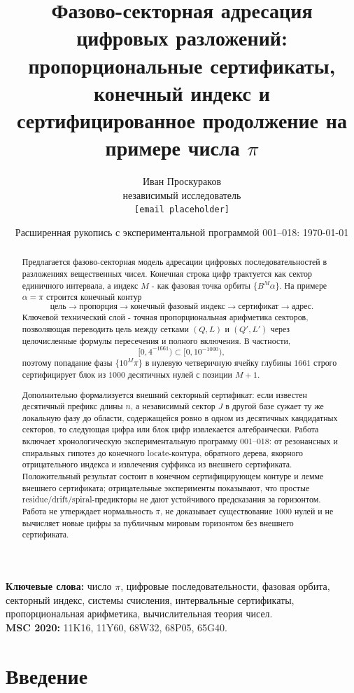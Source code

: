 \documentclass[11pt,a4paper]{article}
\title{Фазово-секторная адресация цифровых разложений:\\
пропорциональные сертификаты, конечный индекс и сертифицированное продолжение на примере числа $\pi$}
\author{Иван Проскураков\\\small независимый исследователь\\\small \texttt{[email placeholder]}}
\date{Расширенная рукопись с экспериментальной программой 001--018: \today}
\begin{document}
\maketitle

\begin{abstract}
Предлагается фазово-секторная модель адресации цифровых последовательностей в разложениях вещественных чисел.  Конечная строка цифр трактуется как сектор единичного интервала, а индекс $M$ - как фазовая точка орбиты $\{B^M\alpha\}$.  На примере $\alpha=\pi$ строится конечный контур
\[
  \text{цель}\to\text{пропорция}\to\text{конечный фазовый индекс}\to\text{сертификат}\to\text{адрес}.
\]
Ключевой технический слой - точная пропорциональная арифметика секторов, позволяющая переводить цель между сетками $(Q,L)$ и $(Q',L')$ через целочисленные формулы пересечения и полного включения.  В частности,
\[
  [0,4^{-1661})\subset[0,10^{-1000}),
\]
поэтому попадание фазы $\{10^M\pi\}$ в нулевую четверичную ячейку глубины $1661$ строго сертифицирует блок из $1000$ десятичных нулей с позиции $M+1$.

Дополнительно формализуется внешний секторный сертификат: если известен десятичный префикс длины $n$, а независимый сектор $J$ в другой базе сужает ту же локальную фазу до области, содержащейся ровно в одном из десятичных кандидатных секторов, то следующая цифра или блок цифр извлекается алгебраически.  Работа включает хронологическую экспериментальную программу 001--018: от резонансных и спиральных гипотез до конечного locate-контура, обратного дерева, якорного отрицательного индекса и извлечения суффикса из внешнего сертификата.  Положительный результат состоит в конечном сертифицирующем контуре и лемме внешнего сертификата; отрицательные эксперименты показывают, что простые residue/drift/spiral-предикторы не дают устойчивого предсказания за горизонтом.  Работа не утверждает нормальность $\pi$, не доказывает существование $1000$ нулей и не вычисляет новые цифры за публичным мировым горизонтом без внешнего сертификата.
\end{abstract}

\noindent\textbf{Ключевые слова:} число $\pi$, цифровые последовательности, фазовая орбита, секторный индекс, системы счисления, интервальные сертификаты, пропорциональная арифметика, вычислительная теория чисел.\\
\noindent\textbf{MSC 2020:} 11K16, 11Y60, 68W32, 68P05, 65G40.

\tableofcontents
\newpage

\section{Введение}
\end{document}
